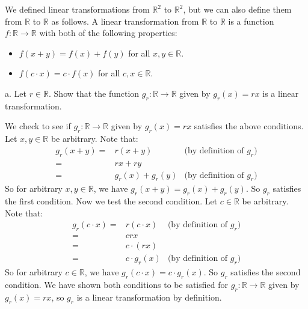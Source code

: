 \documentclass[12pt]{article}
\newenvironment{problem}[2][Problem]
{
	\begin{trivlist} 
		\item[\hskip \labelsep {\bfseries #1 #2:}]
	}
{
	\end{trivlist}
	}
\newenvironment{solution}[1][Solution]
{
	\begin{trivlist} 
		\item[\hskip \labelsep {\itshape #1:}]
	}
	{
	\end{trivlist}
}
\begin{document}
\newpage
\begin{problem}{3}
We defined linear transformations from $\mathbb{R}^2$ to $\mathbb{R}^2$, but we can also define them from $\mathbb{R}$ to $\mathbb{R}$ as follows. A linear transformation from $\mathbb{R}$ to $\mathbb{R}$ is a function $f : \mathbb{R} \to \mathbb{R}$ with both of the following properties:
\begin{itemize}
\item $f(x+y)=f(x) + f(y)$ for all $x,y \in \mathbb{R}$.
\item $f(c \cdot x) = c \cdot f(x)$ for all $c,x \in \mathbb{R}$.
\end{itemize}
\noindent
\newline
\newline
a. Let $r \in \mathbb{R}$. Show that the function $g_{r}: \mathbb{R} \to \mathbb{R}$ given by $g_{r}(x)=rx$ is a linear transformation.
\begin{solution}
We check to see if $g_{r}: \mathbb{R} \to \mathbb{R}$ given by $g_{r}(x)=rx$ satisfies the above conditions. Let $x, y \in \mathbb{R}$ be arbitrary. Note that:
\begin{align*}
g_{r}(x+y) =&r(x+y) &\text{(by definition of $g_{r}$)}\\
=& rx + ry &\\
=& g_{r}(x) + g_{r}(y) &\text{(by definition of $g_{r}$)}
\end{align*}
So for arbitrary $x,y \in \mathbb{R}$, we have $g_{r}(x+y)=g_{r}(x) + g_{r}(y)$. So $g_{r}$ satisfies the first condition. Now we test the second condition. Let $c \in \mathbb{R}$ be arbitrary. Note that:
\begin{align*}
g_{r}(c\cdot x) =&r(c \cdot x) &\text{(by definition of $g_{r}$)}\\
=& crx &\\
=&c \cdot (rx) &\\
=& c\cdot g_{r}(x) &\text{(by definition of $g_{r}$)}
\end{align*}
So for arbitrary $c \in \mathbb{R}$, we have $g_{r}(c\cdot x)=c\cdot g_{r}(x)$. So $g_{r}$ satisfies the second condition.
\noindent
We have shown both conditions to be satisfied for $g_{r}: \mathbb{R} \to \mathbb{R}$ given by $g_{r}(x)=rx$, so $g_{r}$ is a linear transformation by definition.


\end{solution}
\end{problem}
\end{document}
